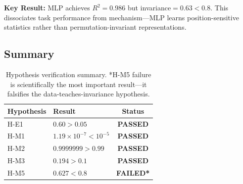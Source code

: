 \textbf{Key Result:} MLP achieves $R^2=0.986$ but invariance$=0.63 < 0.8$. This dissociates task performance from mechanism---MLP learns position-sensitive statistics rather than permutation-invariant representations.

\subsection{Summary}

\begin{table}[h]
\centering
\begin{tabular}{@{}llc@{}}
\toprule
Hypothesis & Result & Status \\
\midrule
H-E1 & $0.60 > 0.05$ & \textbf{PASSED} \\
H-M1 & $1.19 \times 10^{-7} < 10^{-5}$ & \textbf{PASSED} \\
H-M2 & $0.9999999 > 0.99$ & \textbf{PASSED} \\
H-M3 & $0.194 > 0.1$ & \textbf{PASSED} \\
H-M5 & $0.627 < 0.8$ & \textbf{FAILED*} \\
\bottomrule
\end{tabular}
\caption{Hypothesis verification summary. *H-M5 failure is scientifically the most important result---it falsifies the data-teaches-invariance hypothesis.}
\label{tab:summary}
\end{table}
